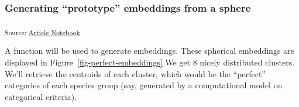 \documentclass[
  authoryear]{elsarticle}
\begin{document}
\subsubsection{Generating ``prototype'' embeddings from a
sphere}\label{generating-prototype-embeddings-from-a-sphere}

\textsubscript{Source:
\href{https://m-delem.github.io/2499-similarity-manuscript/index.qmd.html}{Article
Notebook}}

A function will be used to generate embeddings. These spherical
embeddings are displayed in Figure~\ref{fig-perfect-embeddings} We get 8
nicely distributed clusters. We'll retrieve the centroids of each
cluster, which would be the ``perfect'' categories of each species group
(say, generated by a computational model on categorical criteria).

\begin{figure}

\begin{minipage}{0.50\linewidth}



\end{minipage}%
%
\begin{minipage}{0.50\linewidth}

\centering{

}
\end{minipage}
\end{figure}
\end{document}
